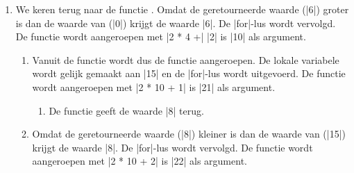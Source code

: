 \begin{cpplstShortInline}
\begin{enumerate}[leftmargin=1.4em]
\begin{enumerate}[label*=\arabic*.,leftmargin=1.4em]
\begin{enumerate}[label*=\arabic*.,leftmargin=1.4em]
\begin{enumerate}[label*=\arabic*.,leftmargin=1.4em]
				\begin{enumerate}[label*=\arabic*.,leftmargin=1.4em]
					\item Vanuit de functie  wordt dus de functie  aangeroepen die de waarde |7| teruggeeft.
				\end{enumerate}
				\item We keren terug naar de functie .
				Omdat de geretourneerde waar\-de (|7|) niet kleiner is dan de waarde van  (|6|) geeft de functie  de waarde |6| terug.
			\end{enumerate}
			\item
			We keren terug naar de functie .
			Omdat de geretourneerde waarde (|6|) groter is dan de waarde van  (|0|) krijgt  de waarde |6|.
			De |for|-lus wordt vervolgd.
			De functie  wordt aangeroepen met |2 * 4 +| |2| is |10| als argument.
			\begin{enumerate}[label*=\arabic*.,leftmargin=1.4em]
				\item Vanuit de functie  wordt dus de functie  aangeroepen.
				De lokale variabele  wordt gelijk gemaakt aan |15| en de |for|-lus wordt uitgevoerd.
				De functie  wordt aangeroepen met |2 * 10 + 1| is |21| als argument.
				\begin{enumerate}[label*=\arabic*.,leftmargin=1.4em]
					\item De functie  geeft de waarde |8| terug.
				\end{enumerate}
				\item Omdat de geretourneerde waarde (|8|) kleiner is dan de waarde van  (|15|) krijgt  de waarde |8|.
				De |for|-lus wordt vervolgd.
				De functie  wordt aangeroepen met |2 * 10 + 2| is |22| als argument.

\end{enumerate}
\end{enumerate}
\end{enumerate}
\end{enumerate}
\end{cpplstShortInline}
